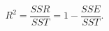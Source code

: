 \begin{equation}
R^2 = \frac {SSR}{SST} = 1 - \frac {SSE}{SST} .
 \label{eq:rsquare}
\end{equation}

